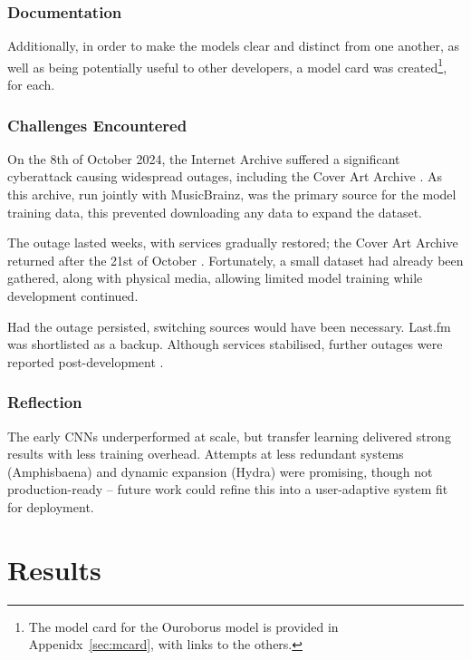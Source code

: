             \subsubsection{Documentation}
    
                Additionally, in order to make the models clear and distinct from one another, as well as being potentially useful to other developers, a model card \cite{Mitchell_2019} was created\footnote{The model card for the Ouroborus model is provided in Appenidx~\ref{sec:mcard}, with links to the others.}, for each.
            
            \subsubsection{Challenges Encountered}
    
                On the 8th of October 2024, the Internet Archive suffered a significant cyberattack causing widespread outages, including the Cover Art Archive \cite{forbes2024}. As this archive, run jointly with MusicBrainz, was the primary source for the model training data, this prevented downloading any data to expand the dataset.
    
                The outage lasted weeks, with services gradually restored; the Cover Art Archive returned after the 21st of October \cite{archiveBlog2024}. Fortunately, a small dataset had already been gathered, along with physical media, allowing limited model training while development continued.
    
                Had the outage persisted, switching sources would have been necessary. Last.fm was shortlisted as a backup. Although services stabilised, further outages were reported post-development \cite{hackread2024}.
    
            \subsubsection*{Reflection}
                The early CNNs underperformed at scale, but transfer learning delivered strong results with less training overhead. Attempts at less redundant systems (Amphisbaena) and dynamic expansion (Hydra) were promising, though not production-ready -- future work could refine this into a user-adaptive system fit for deployment.
    
    \section{Results} %
    
